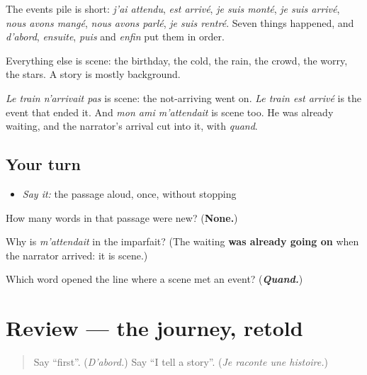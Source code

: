 \begin{culture}
The events pile is short: \emph{j'ai attendu}, \emph{est arrivé}, \emph{je suis monté}, \emph{je suis arrivé}, \emph{nous avons mangé}, \emph{nous avons parlé}, \emph{je suis rentré}. Seven things happened, and \emph{d'abord}, \emph{ensuite}, \emph{puis} and \emph{enfin} put them in order.

Everything else is scene: the birthday, the cold, the rain, the crowd, the worry, the stars. A story is mostly background.

\emph{Le train n'arrivait pas} is scene: the not-arriving went on. \emph{Le train est arrivé} is the event that ended it. And \emph{mon ami m'attendait} is scene too. He was already waiting, and the narrator's arrival cut into it, with \emph{quand}.
\end{culture}

\subsection*{Your turn}
\begin{itemize}
\raggedright
  \item \emph{Say it:} the passage aloud, once, without stopping
\end{itemize}

\begin{tcolorbox}[breakable,colback=teal!4,colframe=teal!35!black,title={Before you move on}]
How many words in that passage were new? (\textbf{None.})

Why is \emph{m'attendait} in the imparfait? (The waiting \textbf{was already going on} when the narrator arrived: it is scene.)

Which word opened the line where a scene met an event? (\emph{\textbf{Quand.}})
\end{tcolorbox}
\section[(review)]{Review — the journey, retold}

\label{lesson:FR-C259-revision-histoire}



\begin{quote}
Say \textquotedblleft{}first\textquotedblright{}. (\emph{D'abord.}) Say \textquotedblleft{}I tell a story\textquotedblright{}. (\emph{Je raconte une histoire.})
\end{quote}

